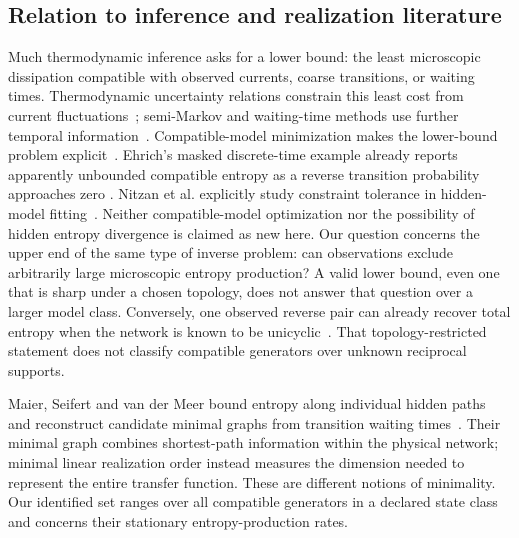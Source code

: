\subsection{Relation to inference and realization literature}
Much thermodynamic inference asks for a lower bound: the least microscopic
dissipation compatible with observed currents, coarse transitions, or
waiting times. Thermodynamic uncertainty relations constrain this least
cost from current fluctuations~\cite{BaratoSeifert2015,Gingrich2016};
semi-Markov and waiting-time methods use further temporal
information~\cite{Martinez2019,vanDerMeer2022,Harunari2022}.
Compatible-model minimization makes the lower-bound problem
explicit~\cite{SkinnerDunkel2021PNAS,SkinnerDunkel2021PRL,Ehrich2021,Nitzan2023}.
Ehrich's masked discrete-time example already reports apparently unbounded
compatible entropy as a reverse transition probability approaches zero
\cite[Sec.~4.1, Fig.~8]{Ehrich2021}. Nitzan et al. explicitly study
constraint tolerance in hidden-model fitting~\cite[Sec.~III.C]{Nitzan2023}.
Neither compatible-model optimization nor the possibility of hidden
entropy divergence is claimed as new here.
Our question concerns the upper end of the same type of inverse problem:
can observations exclude arbitrarily large microscopic entropy production?
A valid lower bound, even one that is sharp under a chosen topology, does
not answer that question over a larger model class.
Conversely, one observed reverse pair can already recover total entropy
when the network is known to be unicyclic~\cite{vanDerMeer2022}.
That topology-restricted statement does not classify compatible generators
over unknown reciprocal supports.

Maier, Seifert and van der Meer bound entropy along individual hidden
paths and reconstruct candidate minimal graphs from transition waiting
times~\cite[Secs.~III, VI--VII]{Maier2025}. Their minimal graph combines
shortest-path information within the physical network; minimal linear
realization order instead measures the dimension needed to represent
the entire transfer function. These are different notions of minimality.
Our identified set ranges over all compatible generators in a declared
state class and concerns their stationary entropy-production rates.

